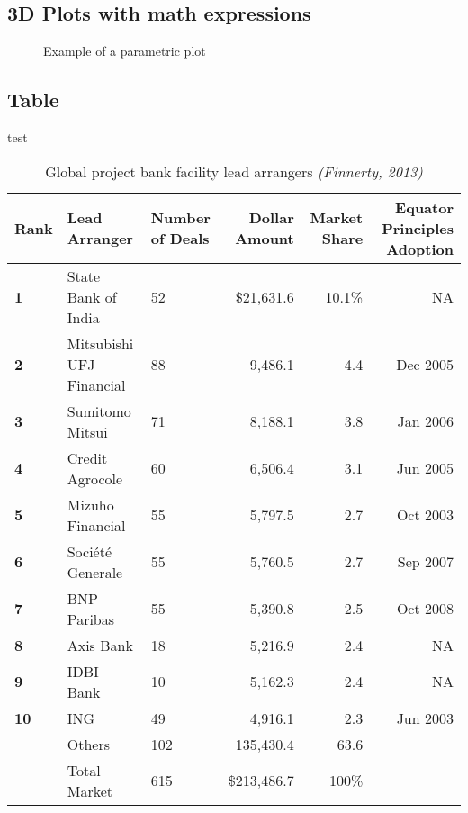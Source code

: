 \documentclass{article}
\begin{document}
\subsection{3D Plots with math expressions}
\begin{figure}
\centering
  \caption{Example of a parametric plot} \label{fig:3}
\end{figure}

\subsection{Table}
test
\begin{table*}[] \centering
\begin{small}
\begin{tabular}{@{}lllrrr@{}}\toprule
\textbf{Rank} & \textbf{Lead Arranger} & \textbf{Number of Deals} & \textbf{Dollar Amount} & \textbf{Market Share} & \textbf{Equator Principles Adoption}\\ \midrule
\textbf{1} & State Bank of India & 52 & \$21,631.6 & 10.1\% & NA\\ \hdashline
\textbf{2} & Mitsubishi UFJ Financial & 88 & 9,486.1 & 4.4 & Dec 2005\\ \hdashline
\textbf{3} & Sumitomo Mitsui & 71 & 8,188.1 & 3.8 & Jan 2006\\ \hdashline
\textbf{4} & Credit Agrocole & 60 & 6,506.4 & 3.1 & Jun 2005\\ \hdashline
\textbf{5} & Mizuho Financial & 55 & 5,797.5 & 2.7 & Oct 2003\\ \hdashline
\textbf{6} & Soci\'{e}t\'{e} Generale & 55 & 5,760.5 & 2.7 & Sep 2007\\ \hdashline
\textbf{7} & BNP Paribas & 55 & 5,390.8 & 2.5 & Oct 2008\\ \hdashline
\textbf{8} & Axis Bank & 18 & 5,216.9 & 2.4 & NA\\ \hdashline
\textbf{9} & IDBI Bank & 10 & 5,162.3 & 2.4 & NA\\ \hdashline
\textbf{10} & ING & 49 & 4,916.1 & 2.3 & Jun 2003\\ \midrule
 & Others & 102 & 135,430.4 & 63.6 & \\ \midrule
 & Total Market & 615 & \$213,486.7 & 100\% & \\
\bottomrule
\end{tabular}
\end{small}
\caption{Global project bank facility lead arrangers \emph{(Finnerty, 2013)}}
\end{table*}
\end{document}
